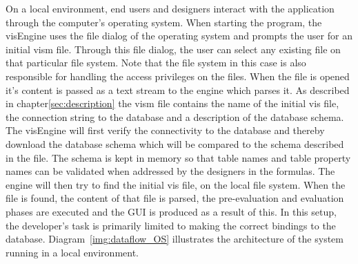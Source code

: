 On a local environment, end users and designers interact with the application through the computer's operating system. When starting the program, the visEngine uses the file dialog of the operating system and prompts the user for an initial vism file. Through this file dialog, the user can select any existing file on that particular file system. Note that the file system in this case is also responsible for handling the access privileges on the files. When the file is opened it's content is passed as a text stream to the engine which parses it. As described in chapter\ref{sec:description} the vism file contains the name of the initial vis file, the connection string to the database and a description of the database schema. The visEngine will first verify the connectivity to the database and thereby download the database schema which will be compared to the schema described in the file. The schema is kept in memory so that table names and table property names can be validated when addressed by the designers in the formulas. The engine will then try to find the initial vis file, on the local file system. When the file is found, the content of that file is parsed, the pre-evaluation and evaluation phases are executed and the GUI is produced as a result of this. In this setup, the developer's task is primarily limited to making the correct bindings to the database. Diagram~\ref{img:dataflow_OS} illustrates the architecture of the system running in a local environment.

